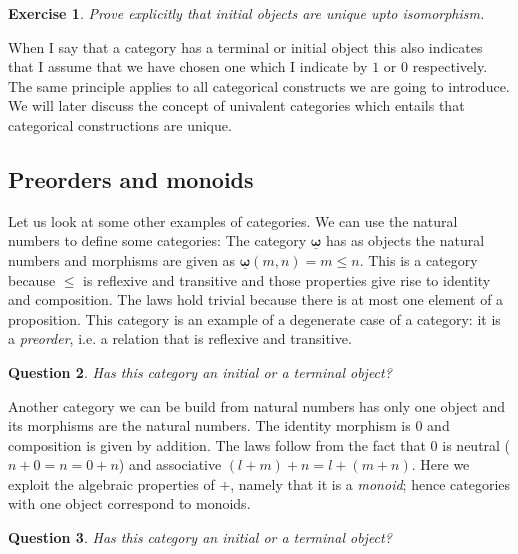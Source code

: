 \documentclass{article}
\newcommand{\Prop}{\mathbf{Prop}}
\newcommand{\cat}[1]{\underline{\mathbf{#1}}}
\newcommand{\homC}[3]{\cat{#1}(#2,#3)}
\newtheorem{exercise}{Exercise}
\newtheorem{question}[exercise]{Question}
\begin{document}
\begin{exercise}
  Prove explicitly that initial objects are unique upto isomorphism.
\end{exercise}

When I say that a category has a terminal or initial object this also indicates that I assume that we have chosen one which I indicate by $1$ or $0$ respectively. The same principle applies to all categorical constructs we are going to introduce. We will later discuss the concept of univalent categories which entails that categorical constructions are unique.

\subsection{Preorders and monoids}
\label{sec:preorders-mnoids}

Let us look at some other examples of categories. We can use the natural numbers to define some categories: The category $\cat{\omega}$ has as objects the natural numbers and morphisms are given as $\homC{\omega}{m}{n} = m \leq n$. This is a category because $\leq$ is reflexive and transitive and those properties give rise to identity and composition. The laws hold trivial because there is at most one element of a proposition. This category is an example of a degenerate case of a category: it is a \emph{preorder}, i.e. a relation that is reflexive and transitive. 

\begin{question}
  Has this category an initial or a terminal object? 
\end{question}


Another category we can be build from natural numbers has only one object and its morphisms are the natural numbers. The identity morphism is $0$ and composition is given by addition. The laws follow from the fact that $0$ is neutral ($n+0 = n = 0+n$) and associative $(l+m)+n = l+(m+n)$. Here we exploit the algebraic properties of $+$, namely that it is a \emph{monoid}; hence categories with one object correspond to monoids.

\begin{question}
  Has this category an initial or a terminal object? 
\end{question}
\end{document}
